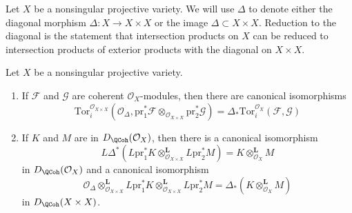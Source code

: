 \noindent
Let $X$ be a nonsingular projective variety. We will use $\Delta$
to denote either the diagonal morphism $\Delta : X \to X \times X$
or the image $\Delta \subset X \times X$.
Reduction to the diagonal is the statement that
intersection products on $X$ can be reduced to intersection products
of exterior products with the diagonal on $X \times X$.

\begin{lemma}
\label{lemma-tor-and-diagonal}
Let $X$ be a nonsingular projective variety.
\begin{enumerate}
\item If $\mathcal{F}$ and $\mathcal{G}$ are coherent $\mathcal{O}_X$-modules,
then there are canonical isomorphisms
$$
\text{Tor}_i^{\mathcal{O}_{X \times X}}(\mathcal{O}_\Delta,
\text{pr}_1^*\mathcal{F} \otimes_{\mathcal{O}_{X \times X}}
\text{pr}_2^*\mathcal{G})
=
\Delta_*\text{Tor}_i^{\mathcal{O}_X}(\mathcal{F}, \mathcal{G})
$$
\item If $K$ and $M$ are in $D_\QCoh(\mathcal{O}_X)$, then
there is a canonical isomorphism
$$
L\Delta^* \left(
L\text{pr}_1^*K \otimes_{\mathcal{O}_{X \times X}}^\mathbf{L} L\text{pr}_2^*M
\right)
= K \otimes_{\mathcal{O}_X}^\mathbf{L} M
$$
in $D_\QCoh(\mathcal{O}_X)$ and a canonical isomorphism
$$
\mathcal{O}_\Delta \otimes_{\mathcal{O}_{X \times X}}^\mathbf{L}
L\text{pr}_1^*K \otimes_{\mathcal{O}_{X \times X}}^\mathbf{L} L\text{pr}_2^*M
= \Delta_*(K \otimes_{\mathcal{O}_X}^\mathbf{L} M)
$$
in $D_\QCoh(X \times X)$.
\end{enumerate}
\end{lemma}

